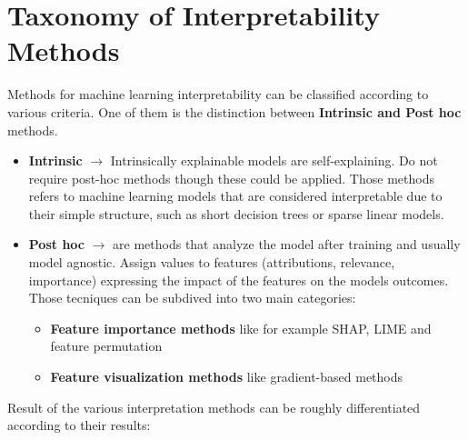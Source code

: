 \section{Taxonomy of Interpretability Methods}
Methods for machine learning interpretability can be classified according to various criteria.
One of them is the distinction between \textbf{Intrinsic and Post hoc} methods.
\begin{itemize}
    \item \textbf{Intrinsic} $\rightarrow$ Intrinsically explainable models are
    self-explaining. Do not require post-hoc methods though these could be
    applied. Those methods refers to machine learning models that are considered interpretable 
    due to their simple structure, such as short decision trees or sparse linear models.

    \item \textbf{Post hoc} $\rightarrow$ are methods that analyze the model after training and usually model agnostic.
    Assign values to features (attributions, relevance, importance) expressing the impact of the features on the models outcomes.
    Those tecniques can be subdived into two main categories:
    \begin{itemize}
        \item \textbf{Feature importance methods} like for example SHAP, LIME and feature permutation
        \item \textbf{Feature visualization methods} like gradient-based methods
    \end{itemize}
\end{itemize}

Result of the various interpretation methods can be roughly differentiated according to their results:
